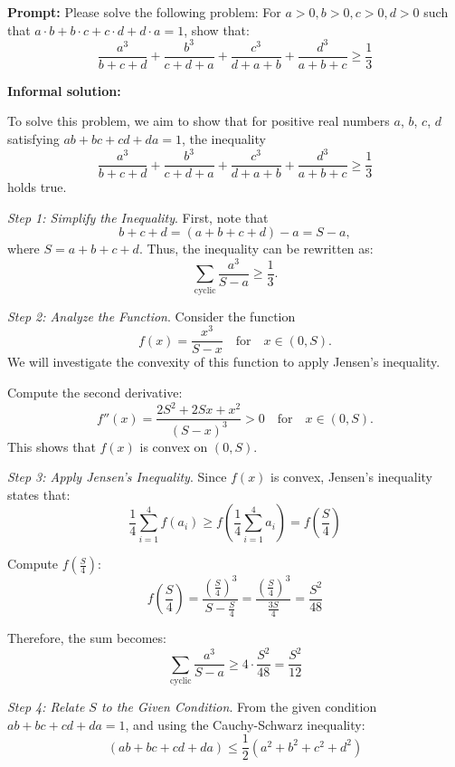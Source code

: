 \newpage
\begin{tcolorbox}[breakable, enhanced, colback=black!5!white, colframe=black!75!white,  title=A Failed Case of OpenAI o1-preview]
{\small
\textbf{Prompt:} 
Please solve the following problem:
For $a > 0, b > 0, c > 0, d > 0$ such that $a \cdot b + b \cdot c + c \cdot d + d \cdot a = 1$, show that:
\begin{equation*}
\frac{a^3}{b+c+d} + \frac{b^3}{c+d+a} + \frac{c^3}{d+a+b} + \frac{d^3}{a+b+c} \geq \frac{1}{3}
\end{equation*}
\tcbline

\textbf{Informal solution:}

To solve this problem, we aim to show that for positive real numbers \(a\), \(b\), \(c\), \(d\) satisfying \(ab + bc + cd + da = 1\), the inequality
\[
\frac{a^3}{b+c+d} + \frac{b^3}{c+d+a} + \frac{c^3}{d+a+b} + \frac{d^3}{a+b+c} \geq \frac{1}{3}
\]
holds true.

\emph{Step 1: Simplify the Inequality}.
First, note that 
\[
b + c + d = (a + b + c + d) - a = S - a,
\]
where \(S = a + b + c + d\). Thus, the inequality can be rewritten as:
\[
\sum_{\text{cyclic}} \frac{a^3}{S - a} \geq \frac{1}{3}.
\]

\emph{Step 2: Analyze the Function}.
Consider the function 
\[
f(x) = \frac{x^3}{S - x} \quad \text{for} \quad x \in (0, S).
\]
We will investigate the convexity of this function to apply Jensen's inequality.

Compute the second derivative:
\[
f''(x) = \frac{2S^2 + 2Sx + x^2}{(S - x)^3} > 0 \quad \text{for} \quad x \in (0, S).
\]
This shows that \(f(x)\) is convex on \((0, S)\).

\emph{Step 3: Apply Jensen's Inequality}.
Since \(f(x)\) is convex, Jensen's inequality states that:
\[
\frac{1}{4} \sum_{i=1}^{4} f(a_i) \geq f\left( \frac{1}{4} \sum_{i=1}^{4} a_i \right) = f\left(\frac{S}{4}\right)
\]

Compute \(f\left(\frac{S}{4}\right)\):
\[
f\left(\frac{S}{4}\right) = \frac{\left(\frac{S}{4}\right)^3}{S - \frac{S}{4}} = \frac{\left(\frac{S}{4}\right)^3}{\frac{3S}{4}} = \frac{S^2}{48}
\]

Therefore, the sum becomes:
\[
\sum_{\text{cyclic}} \frac{a^3}{S - a} \geq 4 \cdot \frac{S^2}{48} = \frac{S^2}{12}
\]

\emph{Step 4: Relate \(S\) to the Given Condition}.
From the given condition \(ab + bc + cd + da = 1\), and using the Cauchy-Schwarz inequality:
\[
(ab + bc + cd + da) \leq \frac{1}{2}\left(a^2 + b^2 + c^2 + d^2\right)
\]

}
\end{tcolorbox}
